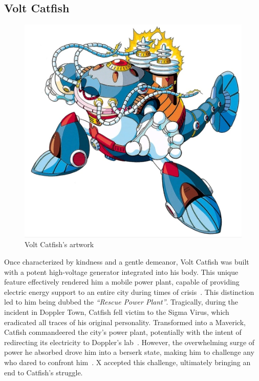 \subsection{Volt Catfish}\label{boss:Volt_catfish}
\begin{figure}[htp]
	\centering
	\includegraphics[height=\portraitsize]{figures/X3/Volt_catfish/voltcatfish.png}
	\caption{Volt Catfish's artwork~\cite{book:MMX_Complete_art}}
\end{figure}

Once characterized by kindness and a gentle demeanor, Volt Catfish was built with a potent high-voltage generator integrated into his body. This unique feature effectively rendered him a mobile power plant, capable of providing electric energy support to an entire city during times of crisis~\cite{wayback:X3_resources}. This distinction led to him being dubbed the \textit{``Rescue Power Plant''}. Tragically, during the incident in Doppler Town, Catfish fell victim to the Sigma Virus, which eradicated all traces of his original personality. Transformed into a Maverick, Catfish commandeered the city's power plant, potentially with the intent of redirecting its electricity to Doppler's lab~\cite{wiki:Volt_catfish}. However, the overwhelming surge of power he absorbed drove him into a berserk state, making him to challenge any who dared to confront him~\cite{Xcoll1:Manual_X3}. X accepted this challenge, ultimately bringing an end to Catfish's struggle.

